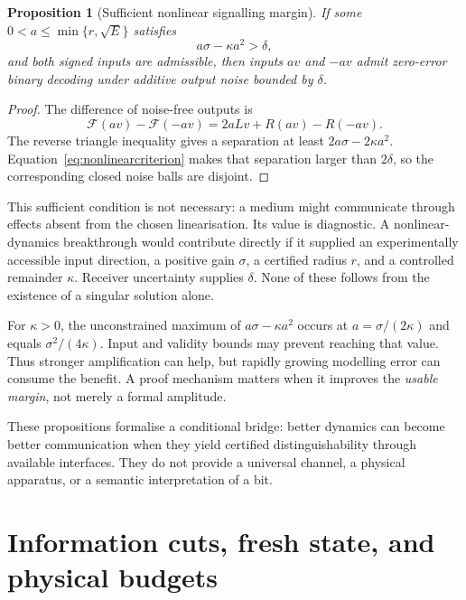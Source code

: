\documentclass[11pt,a4paper]{article}
\newtheorem{proposition}[theorem]{Proposition}
\theoremstyle{definition}
\theoremstyle{remark}
\begin{document}
\begin{proposition}[Sufficient nonlinear signalling margin]\label{prop:nonlinearbit}
If some $0<a\leq\min\{r,\sqrt E\}$ satisfies
\begin{equation}\label{eq:nonlinearcriterion}
 a\sigma-\kappa a^2>\delta,
\end{equation}
and both signed inputs are admissible, then inputs $av$ and $-av$ admit zero-error binary decoding under additive output noise bounded by $\delta$.
\end{proposition}
\begin{proof}
The difference of noise-free outputs is
\[
 \mathcal F(av)-\mathcal F(-av)=2aLv+R(av)-R(-av).
\]
The reverse triangle inequality gives a separation at least $2a\sigma-2\kappa a^2$. Equation~\eqref{eq:nonlinearcriterion} makes that separation larger than $2\delta$, so the corresponding closed noise balls are disjoint.
\end{proof}
This sufficient condition is not necessary: a medium might communicate through effects absent from the chosen linearisation. Its value is diagnostic. A nonlinear-dynamics breakthrough would contribute directly if it supplied an experimentally accessible input direction, a positive gain $\sigma$, a certified radius $r$, and a controlled remainder $\kappa$. Receiver uncertainty supplies $\delta$. None of these follows from the existence of a singular solution alone.

For $\kappa>0$, the unconstrained maximum of $a\sigma-\kappa a^2$ occurs at $a=\sigma/(2\kappa)$ and equals $\sigma^2/(4\kappa)$. Input and validity bounds may prevent reaching that value. Thus stronger amplification can help, but rapidly growing modelling error can consume the benefit. A proof mechanism matters when it improves the \emph{usable margin}, not merely a formal amplitude.

These propositions formalise a conditional bridge: better dynamics can become better communication when they yield certified distinguishability through available interfaces. They do not provide a universal channel, a physical apparatus, or a semantic interpretation of a bit.









\section{Information cuts, fresh state, and physical budgets}\label{sec:cuts}
\end{document}
